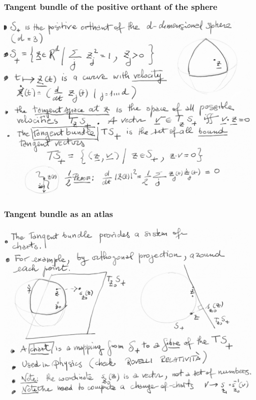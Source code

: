\documentclass[xcolor=svgnames]{beamer}
\begin{document}
\begin{frame}[plain]\frametitle{Tangent bundle of the positive orthant of the sphere}

\includegraphics[width=\textwidth]{exercise/positive-orthant-cropped.pdf}

\end{frame}

\begin{frame}[plain]\frametitle{Tangent bundle as an atlas}

\includegraphics[width=\textwidth]{exercise/atlas-cropped.pdf}

\end{frame}
\end{document}
